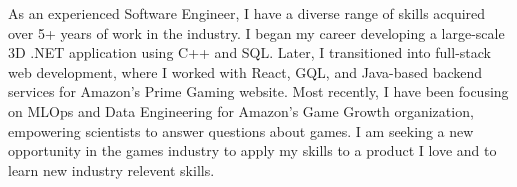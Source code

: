 \documentclass{cv}
\begin{document}
	\makecvheader

	\par{
		As an experienced Software Engineer, I have a diverse range of skills acquired over 5+ years of work in the industry. I began my career developing a large-scale 3D .NET application using C++ and SQL. Later, I transitioned into full-stack web development, where I worked with React, GQL, and Java-based backend services for Amazon's Prime Gaming website. Most recently, I have been focusing on MLOps and Data Engineering for Amazon's Game Growth organization, empowering scientists to answer questions about games. I am seeking a new opportunity in the games industry to apply my skills to a product I love and to learn new industry relevent skills.
	}

	\bigskip
	
\end{document}
